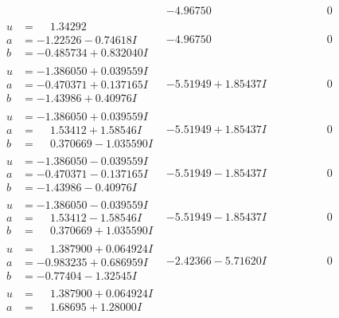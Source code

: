 \documentclass[1p]{elsarticle_modified}
\theoremstyle{definition}
\begin{document}
$$\begin{array}{c|c|c}
 & -4.96750\phantom{ +0.000000I} & \phantom{-0.000000 } 0 \\ \hline\begin{aligned}
u &= \phantom{-}1.34292\phantom{ +0.000000I} \\
a &= -1.22526 - 0.74618 I \\
b &= -0.485734 + 0.832040 I\end{aligned}
 & -4.96750\phantom{ +0.000000I} & \phantom{-0.000000 } 0 \\ \hline\begin{aligned}
u &= -1.386050 + 0.039559 I \\
a &= -0.470371 + 0.137165 I \\
b &= -1.43986 + 0.40976 I\end{aligned}
 & -5.51949 + 1.85437 I & \phantom{-0.000000 } 0 \\ \hline\begin{aligned}
u &= -1.386050 + 0.039559 I \\
a &= \phantom{-}1.53412 + 1.58546 I \\
b &= \phantom{-}0.370669 - 1.035590 I\end{aligned}
 & -5.51949 + 1.85437 I & \phantom{-0.000000 } 0 \\ \hline\begin{aligned}
u &= -1.386050 - 0.039559 I \\
a &= -0.470371 - 0.137165 I \\
b &= -1.43986 - 0.40976 I\end{aligned}
 & -5.51949 - 1.85437 I & \phantom{-0.000000 } 0 \\ \hline\begin{aligned}
u &= -1.386050 - 0.039559 I \\
a &= \phantom{-}1.53412 - 1.58546 I \\
b &= \phantom{-}0.370669 + 1.035590 I\end{aligned}
 & -5.51949 - 1.85437 I & \phantom{-0.000000 } 0 \\ \hline\begin{aligned}
u &= \phantom{-}1.387900 + 0.064924 I \\
a &= -0.983235 + 0.686959 I \\
b &= -0.77404 - 1.32545 I\end{aligned}
 & -2.42366 - 5.71620 I & \phantom{-0.000000 } 0 \\ \hline\begin{aligned}
u &= \phantom{-}1.387900 + 0.064924 I \\
a &= \phantom{-}1.68695 + 1.28000 I \\

\end{aligned}
\end{array}$$
\end{document}

